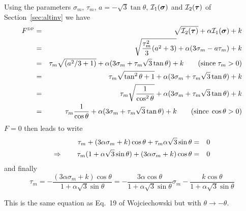 Using the parameters $\sigma_m$, $\tau_m$, $a=-\sqrt{3}\tan\theta$, ${\cal I}_1({\bm \sigma})$ 
and ${\cal I}_2({\bm \tau})$ of Section~\ref{sec:altinv} we have
\begin{eqnarray}
F^{\text{\tiny DP}}
&=&  \sqrt{{\cal I}_2({\bm \tau})} + \alpha {\cal I}_1({\bm \sigma}) + k \nonumber\\
&=& \sqrt{\frac{\tau_m^2}{3}(a^2+3)} + \alpha (3\sigma_m-a\tau_m) + k \nonumber\\ 
&=& \tau_m \sqrt{(a^2/3+1)} + \alpha (3\sigma_m+\tau_m\sqrt{3}\tan\theta ) + k    \qquad ({\rm since }\; \tau_m>0)\nonumber\\ 
&=& \tau_m \sqrt{\tan^2\theta+1} + \alpha (3\sigma_m+\tau_m\sqrt{3}\tan\theta ) + k  \nonumber\\
&=& \tau_m \sqrt{ \frac{1}{\cos^2\theta} } + \alpha (3\sigma_m+\tau_m\sqrt{3}\tan\theta ) + k  \nonumber\\
&=& \tau_m \frac{1}{\cos\theta} +\alpha (3\sigma_m+\tau_m\sqrt{3}\tan\theta ) + k  \qquad ({\rm since }\; \cos\theta >0)\nonumber
\end{eqnarray}
$F=0$ then leads to write
\begin{eqnarray}
\tau_m  + (3 \alpha \sigma_m+k)\cos\theta  + \tau_m \alpha \sqrt{3}\sin\theta  &=&0 \nonumber\\
\Rightarrow \qquad \tau_m(1 + \alpha \sqrt{3}\sin\theta)  + (3 \alpha \sigma_m+k)\cos\theta &=&0 \nonumber
\end{eqnarray}
and finally
\[
\tau_m = -\frac{(3 \alpha \sigma_m+k)\cos\theta}{1 + \alpha \sqrt{3}\sin\theta}
= -\frac{3 \alpha \cos\theta}{1 + \alpha \sqrt{3}\sin\theta} \sigma_m 
-\frac{k\cos\theta}{1 + \alpha \sqrt{3}\sin\theta}
\]
\begin{remark}
This is the same equation as Eq.~19 of Wojciechowski \cite{wojc18} but with $\theta \rightarrow -\theta$. 
\end{remark}

\vspace{.5cm}

